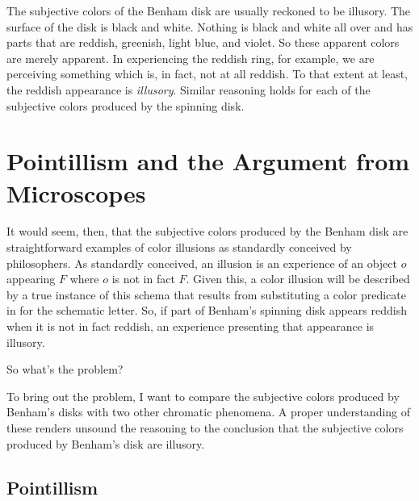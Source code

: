 \documentclass[12pt]{article}
\begin{document}
The subjective colors of the Benham disk are usually reckoned to be illusory. The surface of the disk is black and white. Nothing is black and white all over and has parts that are reddish, greenish, light blue, and violet. So these apparent colors are merely apparent. In experiencing the reddish ring, for example, we are perceiving something which is, in fact, not at all reddish. To that extent at least, the reddish appearance is \emph{illusory}. Similar reasoning holds for each of the subjective colors produced by the spinning disk.

\section{Pointillism and the Argument from Microscopes}\label{sec:pointillism_and_the_argument_from_microscopes} %

It would seem, then, that the subjective colors produced by the Benham disk are straightforward examples of color illusions as standardly conceived by philosophers. As standardly conceived, an illusion is an experience of an object \( o \) appearing \( F \) where \( o \) is not in fact \( F \). Given this, a color illusion will be described by a true instance of this schema that results from substituting a color predicate in for the schematic letter. So, if part of Benham's spinning disk appears reddish when it is not in fact reddish, an experience presenting that appearance is illusory. 

So what's the problem?

To bring out the problem, I want to compare the subjective colors produced by Benham's disks with two other chromatic phenomena. A proper understanding of these renders unsound the reasoning to the conclusion that the subjective colors produced by Benham's disk are illusory.


\subsection{Pointillism}\label{sub:pointillism} %
\end{document}
